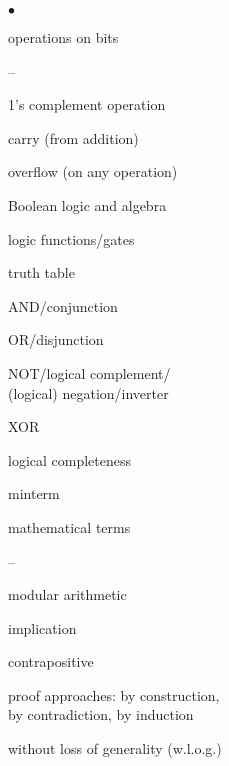 \begin{minipage}[t]{3.0in}
\begin{list}{$\bullet$}{\setlength{\itemsep}{0pt}\setlength{\parskip}{0pt}%
\setlength{\topsep}{0pt}\setlength{\partopsep}{0pt}\setlength{\parsep}{0pt}}
\item{operations on bits
\begin{list}{--}{\setlength{\itemsep}{0pt}\setlength{\parskip}{0pt}%
\setlength{\topsep}{0pt}\setlength{\partopsep}{0pt}\setlength{\parsep}{0pt}}
\item 1's complement operation
\item carry (from addition)
\item overflow (on any operation) %
\item Boolean logic and algebra
\item logic functions/gates
\item truth table
\item AND/conjunction
\item OR/disjunction
\item NOT/logical complement/\\ (logical) negation/inverter
\item XOR
\item logical completeness
\item minterm
\end{list}
}

\item{mathematical terms
\begin{list}{--}{\setlength{\itemsep}{0pt}\setlength{\parskip}{0pt}%
\setlength{\topsep}{0pt}\setlength{\partopsep}{0pt}\setlength{\parsep}{0pt}}
\item modular arithmetic
\item implication
\item contrapositive
\item proof approaches: by construction,\\ by contradiction, by induction
\item without loss of generality (w.l.o.g.)
\end{list}
}

%

\end{list}
\end{minipage}\hfill%

